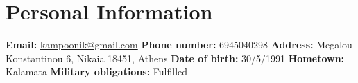 \section{Personal Information}
\textbf{Email:} \href{mailto:kampoonik@gmail.com}{kampoonik@gmail.com}
\newline
\textbf{Phone number:} 6945040298
\newline
\textbf{Address:} Megalou Konstantinou 6, Nikaia 18451, Athens
\newline
\textbf{Date of birth:} 30/5/1991
\newline
\textbf{Hometown:} Kalamata
\newline
\textbf{Military obligations:} Fulfilled
